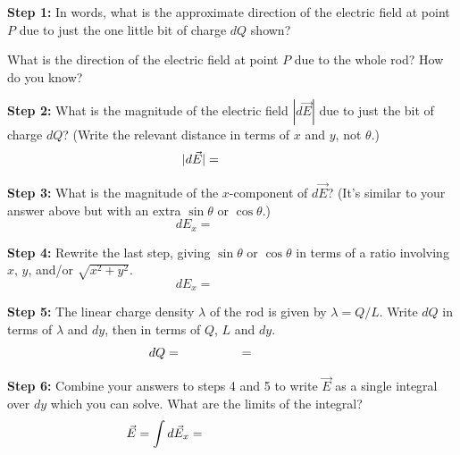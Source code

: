 \par
\vspace{0.5cm}
\par
\textbf{Step 1:} \newline
In words, what is the approximate direction of the electric field at point $P$ due to just the one little bit of charge $dQ$ shown?

\vspace{.6in}

What is the direction of the electric field at point $P$ due to the whole rod?  How do you know?

\vspace{.6in}

\textbf{Step 2:} \newline
What is the magnitude of the electric field $|d\vec{E}|$  due to just the bit of charge $dQ$?  (Write the relevant distance in terms of $x$ and $y$, not $\theta$.)
\[
|d\vec{E}|=\hspace{0.7in}
\]
\vspace{.3in}

\textbf{Step 3:} \newline
What is the magnitude of the $x$-component of   $d\vec{E}$?  (It's similar to your answer above but with an extra $\sin \theta$ or $\cos \theta$.) 
\[
d{E}_x=\hspace{1in}
\]
\vspace{.3in}

\pagebreak
\textbf{Step 4:} \newline
Rewrite the last step, giving  $\sin \theta$ or $\cos \theta$ in terms of a ratio involving $x$, $y$, and/or $\sqrt{x^2 + y^2}$.
\[
d{E}_x=\hspace{1in}
\]
\vspace{.3in}

\textbf{Step 5:} \newline
The linear charge density $\lambda$ of the rod is given by $\lambda = Q/L$.  Write $dQ$ in terms of $\lambda$  and $dy$, then in terms of $Q$, $L$ and $dy$.
\[
dQ=\hspace{0.7in}=\hspace{0.7in}
\]
\vspace{.3in}

\textbf{Step 6:} \newline
Combine your answers to steps 4 and 5 to write $\vec{E}$ as a single integral over $dy$ which you can solve.  What are the limits of the integral?
\[
\vec{E}=\int d\vec{E}_x=\hspace{1.5in}
\]
\vspace{.3in}

